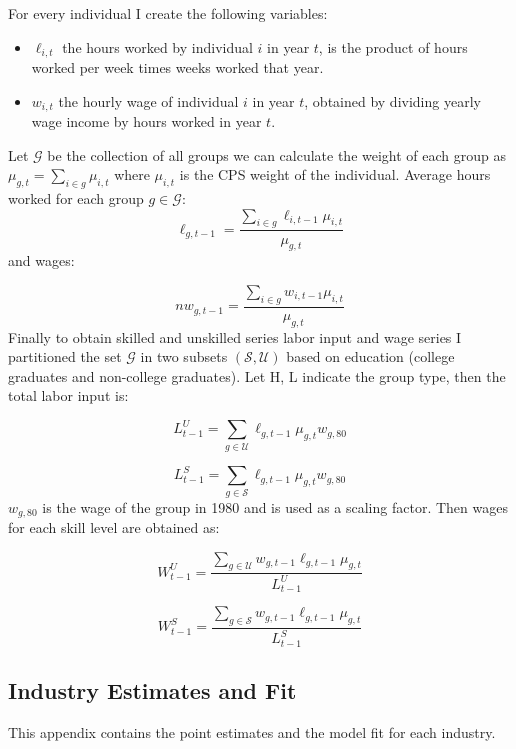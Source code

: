 \documentclass[12pt]{article}
\begin{document}
For every individual I create the following variables:
\begin{itemize}
\item $\ell_{i,t}$ the hours worked by individual $i$ in year $t$, is the product of hours worked per week times weeks worked that year.
\item $w_{i,t}$ the hourly wage of individual $i$ in year $t$, obtained by dividing yearly wage income by hours worked in year $t$.
\end{itemize}

Let $\mathcal{G}$ be the collection of all groups we can calculate the weight of each group as $\mu_{g,t} = \sum_{i\in g} \mu_{i,t}$ where $ \mu_{i,t}$ is the CPS weight of the individual. Average hours worked for each group $g\in\mathcal{G}$: 
\[
\ell_{g, t-1} = \frac{\sum_{i\in g}\ell_{i,t-1} \mu_{i,t}}{\mu_{g, t}}
\]
and wages:

\[
nw_{g, t-1} = \frac{\sum_{i\in g}w_{i,t-1} \mu_{i,t}}{\mu_{g, t}}
\]
Finally to obtain skilled and unskilled series labor input and wage series I partitioned the set $\mathcal{G}$ in two subsets $(\mathcal{S}, \mathcal{U})$ based on education (college graduates and non-college graduates). Let {H, L} indicate the group type, then the total labor input is:

\[
 L^U_{t-1} = \sum_{g \in\mathcal{U}} \ell_{g, t-1} \mu_{g,t} w_{g,80}
\]

\[
 L^S_{t-1} = \sum_{g \in\mathcal{S}} \ell_{g, t-1} \mu_{g,t} w_{g,80}
\]
$w_{g,80}$ is the wage of the group in 1980 and is used as a scaling factor. Then wages for each skill level are obtained as:

\[
 W^U_{t-1} = \frac{\sum_{g \in \mathcal{U}} w_{g, t-1} \ell_{g, t-1} \mu_{g,t}}{L^U_{t-1}}
\]

\[
 W^S_{t-1} = \frac{\sum_{g \in \mathcal{S}} w_{g, t-1} \ell_{g, t-1} \mu_{g,t}}{L^S_{t-1}}
\]


\pagebreak
\begin{landscape}

\section{Industry Estimates and Fit}\label{sec:industry-trends}
This appendix contains the point estimates and the model fit for each industry.

 
\end{landscape}


\end{document}

